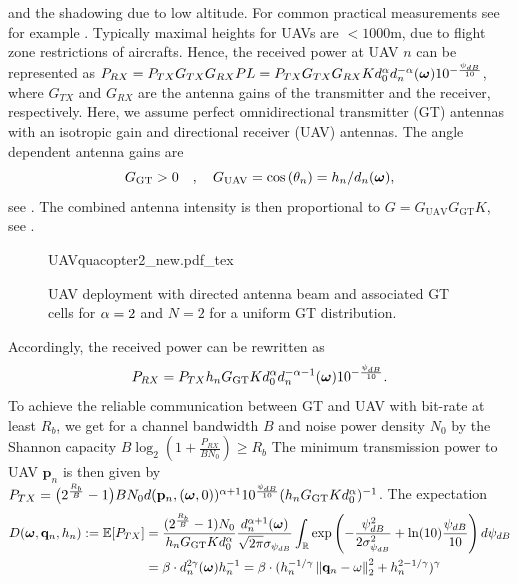 \documentclass[smallabstract,smallcaptions]{dccpaper}
\newcounter{example}[section]
\renewcommand{\vq}{\mathbf p}
\renewcommand{\vp}{\mathbf q}
\newcommand{\Rb}{\ensuremath{R_b}}         %
\newcommand{\GGT}{\ensuremath{G_{\text{GT}}}}         %
\newcommand{\GUAV}{\ensuremath{G_{\text{UAV}}}}         %
\newcommand{\Dis}{\ensuremath{D}}                    %
\begin{document}
%
and the shadowing due to low altitude.  For common practical measurements see for example \cite{AG18}.  Typically
maximal heights for UAVs are $<1000$m, due to flight zone restrictions of aircrafts.  Hence, the received power at
UAV $n$ can be represented as
%
$P_{RX}=P_{TX}G_{TX}G_{RX}PL=P_{TX}G_{TX}G_{RX}Kd^{\alpha}_0 d_n^{-\alpha}(\boldsymbol{ \omega})10^{-\frac{\psi_{dB}}{10}}$,
%
where $G_{TX}$ and $G_{RX}$ are the antenna gains of the transmitter and the receiver, respectively. Here, we assume
perfect omnidirectional transmitter (GT) antennas with an isotropic gain and directional receiver (UAV) antennas.  The
angle dependent antenna gains are %
%
\begin{equation}
\GGT >0\quad,\quad
  \GUAV = \cos\left(\theta_n\right)=h_n/d_n(\vome),
\label{eq:Gdirected}
\end{equation}
%
see \cite[pp.52]{Bal05a}. The combined antenna intensity is then proportional to
%
$G=\GUAV \GGT K$, see .
%
\begin{figure}
  \centering
  \def\svgwidth{.85\textwidth} \scriptsize{
    {UAVquacopter2_new.pdf_tex}}
    \caption{UAV deployment with directed antenna beam and associated GT cells for $\alpha=2$ and $N=2$ for a uniform GT distribution.}
    \label{fig:uavdirected}
\end{figure}
%
Accordingly, the received power can be rewritten as
%
\begin{equation}
  P_{RX}=P_{TX}h_n \GGT K d^{\alpha}_0 d_n^{-\alpha-1}(\vome)10^{-\frac{\psi_{dB}}{10}}.
\end{equation}
%
To achieve the reliable communication between GT and UAV with bit-rate at least $\Rb$, we get for a
channel bandwidth $B$  and noise power density $N_0$ by the Shannon capacity 
$B\log_2\left(1+\frac{P_{RX}}{BN_0}\right)\ge\Rb$
The minimum transmission power to UAV $\vq_n$ is then given by
$P_{TX}=\big(2^{\frac{\Rb}{B}}-1\big)B N_0d(\vq_n,(\vome,0))^{\alpha+1}10^{\frac{\psi_{dB}}{10}} (h_n \GGT
Kd^{\alpha}_0)^{-1}$.
%
%
The expectation  %
%
\begin{align}
 \Dis(\vome,\vp_n,h_n):= \Expect{P_{TX}}& =
  \frac{(2^{\frac{\Rb}{B}}-1)N_0 }{ h_n \GGT Kd^{\alpha}_0}
  \frac{d_n^{\alpha+1}(\vome)}{\sqrt{2\pi}\sigma_{\psi_{dB}}} \int_{\R}
     \exp\left(-\frac{\psi^2_{dB}}{2\sigma^2_{\psi_{dB}}}+ \ln(10) \frac{\psi_{dB}}{10}\right)d\psi_{dB}\notag\\
     &=\bet \cdot
     d_n^{2\gam}(\vome) h_n^{-1}=\bet\cdot (h_n^{-1/\gam}\Norm{\vp_n-\ome}_2^2+h_n^{2-1/\gam})^\gam
   \label{eq:Eptx}
\end{align}
\end{document}
